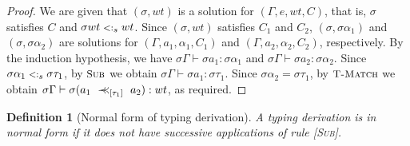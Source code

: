 \documentclass{eptcs}
\newcommand{\ih}{induction hypothesis\xspace}
\newcommand{\CC}{\ensuremath{C}\xspace}
\newcommand{\match}{\mathrel{\mbox{$\prec\hspace{-0.5em}\prec$}}}
\newcommand{\Sub}{{\small \textsc{Sub}}}
\newcommand{\TMatch}{{\small \textsc{T-Match}}}
\newcommand{\sub}{\mathrel{\mbox{{\footnotesize $<:$}}}}
\newcommand{\wt}[0]{{\ensuremath{wt}}}
\newtheorem{defn}[thm]{Definition}
\begin{document}
\begin{proof}
We are given that $(\sigma,\wt)$ is a solution for $(\Gamma, e, \wt, \CC)$, that
is, $\sigma$ satisfies $\CC$ and
$\sigma \wt \sub_s \wt$. Since $(\sigma,\wt)$ satisfies $\CC_1$ and $\CC_2$,
$(\sigma, \sigma\alpha_1)$ and $(\sigma, \sigma\alpha_2)$ are solutions for
$(\Gamma, a_1, \alpha_1, \CC_1)$ and $(\Gamma,a_2,\alpha_2,\CC_2)$, respectively.
By the \ih, we have $\sigma\Gamma \vdash \sigma a_1: \sigma\alpha_1$ and
$\sigma\Gamma \vdash \sigma a_2 : \sigma\alpha_2$. Since $\sigma\alpha_1 \sub_s
\sigma\tau_1$, by $\Sub$ we obtain
$\sigma\Gamma \vdash \sigma a_1: \sigma\tau_1$. Since $\sigma\alpha_2 =
\sigma \tau_1$, by
$\TMatch$ we obtain $\sigma\Gamma \vdash \sigma(a_1 ~\match_{[\tau_1]}~ a_2) : \wt$, as required.
\end{proof}

\begin{defn}[Normal form of typing derivation]
A typing derivation is in {\em normal form} if it does not have successive
applications of rule \textsc{[\Sub]}.
\end{defn}
\end{document}
